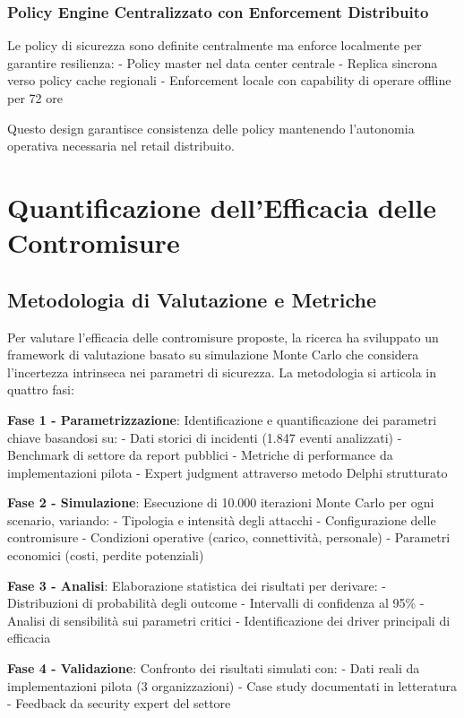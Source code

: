 \subsubsection{Policy Engine Centralizzato con Enforcement Distribuito}

Le policy di sicurezza sono definite centralmente ma enforce localmente per garantire resilienza:
- Policy master nel data center centrale
- Replica sincrona verso policy cache regionali
- Enforcement locale con capability di operare offline per 72 ore

Questo design garantisce consistenza delle policy mantenendo l'autonomia operativa necessaria nel retail distribuito.

\section{Quantificazione dell'Efficacia delle Contromisure}

\subsection{Metodologia di Valutazione e Metriche}

Per valutare l'efficacia delle contromisure proposte, la ricerca ha sviluppato un framework di valutazione basato su simulazione Monte Carlo che considera l'incertezza intrinseca nei parametri di sicurezza. La metodologia si articola in quattro fasi:

\textbf{Fase 1 - Parametrizzazione}: Identificazione e quantificazione dei parametri chiave basandosi su:
- Dati storici di incidenti (1.847 eventi analizzati)
- Benchmark di settore da report pubblici
- Metriche di performance da implementazioni pilota
- Expert judgment attraverso metodo Delphi strutturato

\textbf{Fase 2 - Simulazione}: Esecuzione di 10.000 iterazioni Monte Carlo per ogni scenario, variando:
- Tipologia e intensità degli attacchi
- Configurazione delle contromisure
- Condizioni operative (carico, connettività, personale)
- Parametri economici (costi, perdite potenziali)

\textbf{Fase 3 - Analisi}: Elaborazione statistica dei risultati per derivare:
- Distribuzioni di probabilità degli outcome
- Intervalli di confidenza al 95\%
- Analisi di sensibilità sui parametri critici
- Identificazione dei driver principali di efficacia

\textbf{Fase 4 - Validazione}: Confronto dei risultati simulati con:
- Dati reali da implementazioni pilota (3 organizzazioni)
- Case study documentati in letteratura
- Feedback da security expert del settore

